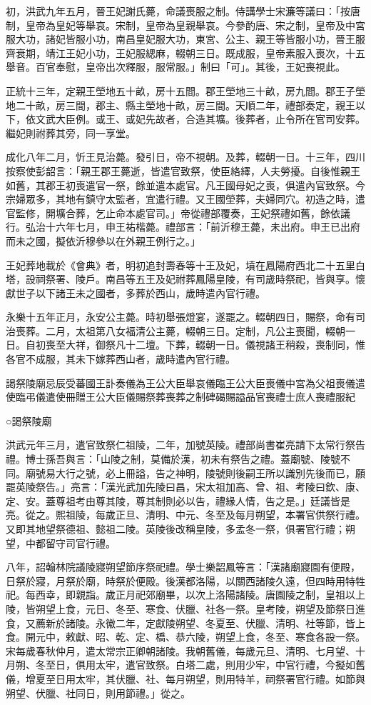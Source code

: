 初，洪武九年五月，晉王妃謝氏薨，命議喪服之制。侍講學士宋濂等議曰：「按唐制，皇帝為皇妃等舉哀。宋制，皇帝為皇親舉哀。今參酌唐、宋之制，皇帝及中宮服大功，諸妃皆服小功，南昌皇妃服大功，東宮、公主、親王等皆服小功，晉王服齊衰期，靖江王妃小功，王妃服緦麻，輟朝三日。既成服，皇帝素服入喪次，十五舉音。百官奉慰，皇帝出次釋服，服常服。」制曰「可」。其後，王妃喪視此。

正統十三年，定親王塋地五十畝，房十五間。郡王塋地三十畝，房九間。郡王子塋地二十畝，房三間，郡主、縣主塋地十畝，房三間。天順二年，禮部奏定，親王以下，依文武大臣例。或王、或妃先故者，合造其壙。後葬者，止令所在官司安葬。繼妃則祔葬其旁，同一享堂。

成化八年二月，忻王見治薨。發引日，帝不視朝。及葬，輟朝一日。十三年，四川按察使彭韶言：「親王郡王薨逝，皆遣官致祭，使臣絡繹，人夫勞擾。自後惟親王如舊，其郡王初喪遣官一祭，餘並遣本處官。凡王國母妃之喪，俱遣內官致祭。今宗婦眾多，其地有鎮守太監者，宜遣行禮。又王國塋葬，夫婦同穴。初造之時，遣官監修，開壙合葬，乞止命本處官司。」帝從禮部覆奏，王妃祭禮如舊，餘依議行。弘治十六年七月，申王祐楷薨。禮部言：「前沂穆王薨，未出府。申王已出府而未之國，擬依沂穆參以在外親王例行之。」

王妃葬地載於《會典》者，明初追封壽春等十王及妃，墳在鳳陽府西北二十五里白塔，設祠祭署、陵戶。南昌等五王及妃祔葬鳳陽皇陵，有司歲時祭祀，皆與享。懷獻世子以下諸王未之國者，多葬於西山，歲時遣內官行禮。

永樂十五年正月，永安公主薨。時初舉張燈宴，遂罷之。輟朝四日，賜祭，命有司治喪葬。二月，太祖第八女福清公主薨，輟朝三日。定制，凡公主喪聞，輟朝一日。自初喪至大祥，御祭凡十二壇。下葬，輟朝一日。儀視諸王稍殺，喪制同，惟各官不成服，其未下嫁葬西山者，歲時遣內官行禮。

謁祭陵廟忌辰受蕃國王訃奏儀為王公大臣舉哀儀臨王公大臣喪儀中宮為父祖喪儀遣使臨弔儀遣使冊贈王公大臣儀賜祭葬喪葬之制碑碣賜謚品官喪禮士庶人喪禮服紀

○謁祭陵廟

洪武元年三月，遣官致祭仁祖陵，二年，加號英陵。禮部尚書崔亮請下太常行祭告禮。博士孫吾與言：「山陵之制，莫備於漢，初未有祭告之禮。蓋廟號、陵號不同。廟號易大行之號，必上冊謚，告之神明，陵號則後嗣王所以識別先後而已，願罷英陵祭告。」亮言：「漢光武加先陵曰昌，宋太祖加高、曾、祖、考陵曰欽、康、定、安。蓋尊祖考由尊其陵，尊其制則必以告，禮緣人情，告之是。」廷議皆是亮。從之。熙祖陵，每歲正旦、清明、中元、冬至及每月朔望，本署官供祭行禮。又即其地望祭德祖、懿祖二陵。英陵後改稱皇陵，多孟冬一祭，俱署官行禮；朔望，中都留守司官行禮。

八年，詔翰林院議陵寢朔望節序祭祀禮。學士樂韶鳳等言：「漢諸廟寢園有便殿，日祭於寢，月祭於廟，時祭於便殿。後漢都洛陽，以關西諸陵久遠，但四時用特牲祀。每西幸，即親詣。歲正月祀郊廟畢，以次上洛陽諸陵。唐園陵之制，皇祖以上陵，皆朔望上食，元日、冬至、寒食、伏臘、社各一祭。皇考陵，朔望及節祭日進食，又薦新於諸陵。永徽二年，定獻陵朔望、冬夏至、伏臘、清明、社等節，皆上食。開元中，敕獻、昭、乾、定、橋、恭六陵，朔望上食，冬至、寒食各設一祭。宋每歲春秋仲月，遣太常宗正卿朝諸陵。我朝舊儀，每歲元旦、清明、七月望、十月朔、冬至日，俱用太牢，遣官致祭。白塔二處，則用少牢，中官行禮，今擬如舊儀，增夏至日用太牢，其伏臘、社、每月朔望，則用特羊，祠祭署官行禮。如節與朔望、伏臘、社同日，則用節禮。」從之。

